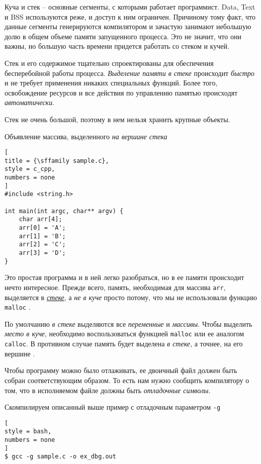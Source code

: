 \documentclass[%
	11pt,
	a4paper,
	utf8,
		]{article}
\begin{document}
Куча и стек -- основные сегменты, с которыми работает программист. Data, Text и BSS используются реже, и доступ к ним ограничен. Причиному тому факт, что данные сегменты генерируются компилятором и зачастую занимают небольшую долю в общем объеме памяти запущенного процесса. Это не значит, что они важны, но большую часть времени придется работать со стеком и кучей.

Стек и его содержимое тщательно спроектированы для обеспечения бесперебойной работы процесса. \emph{Выделение памяти в стеке} происходит \emph{быстро} и не требует применения никаких специальных функций. Более того, освобождение ресурсов и все действия по управлению памятью происходят \emph{автоматически}.

Стек не очень большой, поэтому в нем нельзя хранить крупные объекты.

Объявление массива, выделенного \emph{на вершине стека}
\begin{lstlisting}[
title = {\sffamily sample.c},
style = c_cpp,
numbers = none
]
#include <string.h>

int main(int argc, char** argv) {
    char arr[4];
    arr[0] = 'A';
    arr[1] = 'B';
    arr[2] = 'C';
    arr[3] = 'D';
}
\end{lstlisting}

Это простая программа и в ней легко разобраться, но в ее памяти происходит нечто интересное. Прежде всего, память, необходимая для массива \verb|arr|, выделяется в \underline{\itshape стеке}, а \emph{не в куче} просто потому, что мы не использовали функцию \verb|malloc| \cite[]{amini-extreme-c:2022}.

По умолчанию \emph{в стеке} выделяются все \emph{переменные} и \emph{массивы}. Чтобы выделить \emph{место в куче}, необходимо воспользоваться функцией \verb|malloc| или ее аналогом \verb|calloc|. {\color{red}В противном случае память будет выделена \emph{в стеке}, а точнее, на его вершине} \cite[]{amini-extreme-c:2022}.

Чтобы программу можно было отлаживать, ее двоичный файл должен быть собран соответствующим образом. То есть нам нужно сообщить компилятору о том, что в исполняемом файле должны быть \emph{отладочные символы}.

Скомпилируем описанный выше пример с отладочным параметром \verb|-g|
\begin{lstlisting}[
style = bash,
numbers = none
]
$ gcc -g sample.c -o ex_dbg.out
\end{lstlisting}
\end{document}
